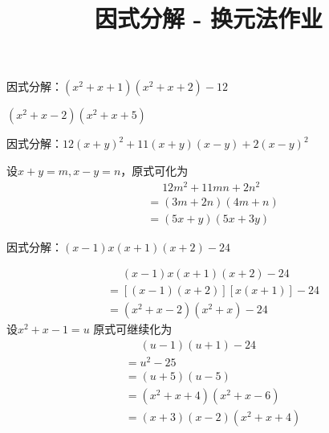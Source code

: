 \documentclass[windows,csize4,answers]{BHCexam}
\title{因式分解 - 换元法作业}
\begin{document}
\maketitle


\begin{groups}
    \begin{questions}[]

        \question[5] 因式分解：$(x^2+x+1)(x^2+x+2)-12$
        \begin{solution}{0.5cm}
            \methodonly $(x^2+x-2)(x^2+x+5)$
        \end{solution}
        \vspace{3.5cm}

        \question[5] 因式分解：$12(x+y)^2+11(x+y)(x-y)+2(x-y)^2$
        \begin{solution}{0.5cm}
            \methodonly 设$x+y=m,x-y=n$，原式可化为
            \[
                \begin{aligned}
                     & \phantom{=}12m^2+11mn+2n^2 \\
                     & = (3m+2n)(4m+n)            \\
                     & = (5x+y)(5x+3y)
                \end{aligned}
            \]
        \end{solution}
        \vspace{3.5cm}

        \question[5] 因式分解：$(x-1)x(x+1)(x+2)-24$
        \begin{solution}{0.5cm}
            \methodonly
            \[
                \begin{aligned}
                     & \phantom{=}(x-1)x(x+1)(x+2)-24 \\
                     & = [(x-1)(x+2)][x(x+1)]-24      \\
                     & = (x^2+x-2)(x^2+x)-24
                \end{aligned}
            \]
            设$x^2+x-1=u$ 原式可继续化为
            \[
                \begin{aligned}
                     & \phantom{=}(u-1)(u+1)-24 \\
                     & = u^2-25                 \\
                     & = (u+5)(u-5)             \\
                     & = (x^2+x+4)(x^2+x-6)     \\
                     & = (x+3)(x-2)(x^2+x+4)
                \end{aligned}
            \]
        \end{solution}
        \vspace{3.5cm}


\end{questions}
\end{groups}
\end{document}
